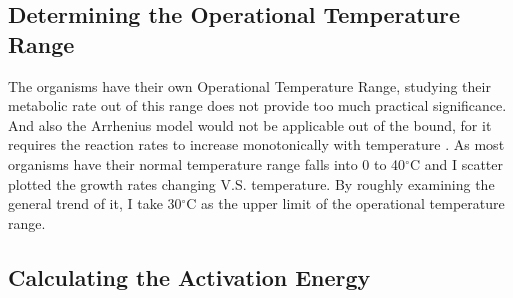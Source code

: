 \documentclass[a4paper]{article}
\begin{document}

\subsection{Determining the Operational Temperature Range}
The organisms have their own Operational Temperature Range, studying their metabolic rate out of this range does not provide too much practical significance. And also the Arrhenius model would not be applicable out of the bound, for it requires the reaction rates to increase monotonically with temperature \citep{peleg2012arrhenius}. As most organisms have their normal temperature range falls into 0 to 40$^\circ$C \citep{thompson1942growth} and I scatter plotted the growth rates changing V.S. temperature. By roughly examining the general trend of it, I take 30$^\circ$C as the upper limit of the operational temperature range.\\



\subsection{Calculating the Activation Energy}
\end{document}
